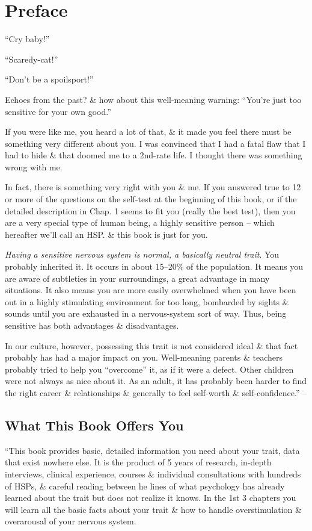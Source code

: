 \documentclass{article}
\numberwithin{equation}{section}
\begin{document}
\section*{Preface}
``Cry baby!''

``Scaredy-cat!''

``Don't be a spoilsport!''

Echoes from the past? \& how about this well-meaning warning: ``You're just too sensitive for your own good.''

If you were like me, you heard a lot of that, \& it made you feel there must be something very different about you. I was convinced that I had a fatal flaw that I had to hide \& that doomed me to a 2nd-rate life. I thought there was something wrong with me.

In fact, there is something very right with you \& me. If you answered true to 12 or more of the questions on the self-test at the beginning of this book, or if the detailed description in Chap. 1 seems to fit you (really the best test), then you are a very special type of human being, a highly sensitive person -- which hereafter we'll call an HSP. \& this book is just for you.

\textit{Having a sensitive nervous system is normal, a basically neutral trait}. You probably inherited it. It occurs in about 15--20\% of the population. It means you are aware of subtleties in your surroundings, a great advantage in many situations. It also means you are more easily overwhelmed when you have been out in a highly stimulating environment for too long, bombarded by sights \& sounds until you are exhausted in a nervous-system sort of way. Thus, being sensitive has both advantages \& disadvantages.

In our culture, however, possessing this trait is not considered ideal \& that fact probably has had a major impact on you. Well-meaning parents \& teachers probably tried to help you ``overcome'' it, as if it were a defect. Other children were not always as nice about it. As an adult, it has probably been harder to find the right career \& relationships \& generally to feel self-worth \& self-confidence.'' -- \cite[p. 27]{Aron2013}

\subsection*{What This Book Offers You}
``This book provides basic, detailed information you need about your trait, data that exist nowhere else. It is the product of 5 years of research, in-depth interviews, clinical experience, courses \& individual consultations with hundreds of HSPs, \& careful reading between he lines of what psychology has already learned about the trait but does not realize it knows. In the 1st 3 chapters you will learn all the basic facts about your trait \& how to handle overstimulation \& overarousal of your nervous system.
\end{document}
